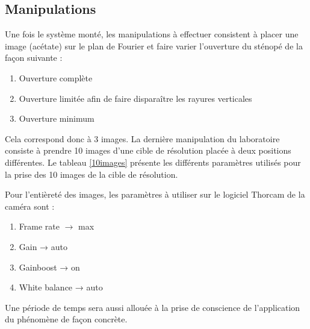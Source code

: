 \documentclass[11pt,letterpaper]{article}
\begin{document}
\subsection{Manipulations}

Une fois le système monté, les manipulations à effectuer consistent à placer une image (acétate) sur le plan de Fourier et faire varier l'ouverture du sténopé de la façon suivante : 

\begin{enumerate}
    \item Ouverture complète
    \item Ouverture limitée afin de faire disparaître les rayures verticales
    \item Ouverture minimum
\end{enumerate}

Cela correspond donc à 3 images. La dernière manipulation du laboratoire consiste à prendre 10 images d'une cible de résolution placée à deux positions différentes. Le tableau \ref{10images} présente les différents paramètres utilisés pour la prise des 10 images de la cible de résolution. 

\begin{table}[h!]
\centering
{}
\caption{Tableau des paramètres utilisés pour la prise des 10 images}
\label{10images}
\end{table}

Pour l'entièreté des images, les paramètres à utiliser sur le logiciel Thorcam de la caméra sont : 

\begin{enumerate}
    \item Frame rate $\rightarrow$ max
    \item Gain → auto
    \item Gainboost → on
    \item White balance → auto
\end{enumerate}

Une période de temps sera aussi allouée à la prise de conscience de l'application du phénomène de façon concrète. 
\end{document}
